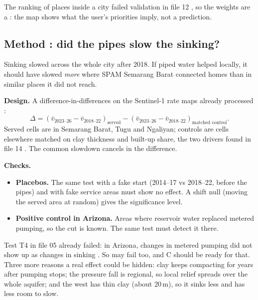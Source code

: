 The ranking of places inside a city failed validation in file 12 \cite{exp12}, so the weights are a
\Scn: the map shows what the user's priorities imply, not a prediction.

\subsection{Method : did the pipes slow the sinking?}\label{sec:did}

\begin{plain}
Sinking slowed across the whole city after 2018. If piped water helped locally, it should have slowed
\emph{more} where SPAM Semarang Barat connected homes than in similar places it did not reach.
\end{plain}

\textbf{Design.} A difference-in-differences on the Sentinel-1 rate maps already processed :
\[
\Delta = (\bar v_{2023\text{--}26} - \bar v_{2018\text{--}22})_{\text{served}} - (\bar v_{2023\text{--}26} - \bar v_{2018\text{--}22})_{\text{matched control}} .
\]
Served cells are in Semarang Barat, Tugu and Ngaliyan; controls are cells elsewhere matched on clay
thickness and built-up share, the two drivers found in file 14 \cite{exp14}. The common slowdown cancels
in the difference.

\textbf{Checks.}
\begin{itemize}
\item {} \textbf{Placebos.} The same test with a fake start (2014--17 vs 2018--22, before the pipes) and
  with fake service areas must show no effect. A shift null (moving the served area at random) gives the
  significance level.
\item {} \textbf{Positive control in Arizona.} Areas where reservoir water replaced metered pumping, so
  the cut is known. The same test must detect it there.
\end{itemize}

\begin{caution}
Test T4 in file 05 already failed: in Arizona, changes in metered pumping did not show up as changes in
sinking \cite{exp05}. So  may fail too, and C should be ready for that. Three more reasons a real
effect could be hidden: clay keeps compacting for years after pumping stops; the pressure fall is regional,
so local relief spreads over the whole aquifer; and the west has thin clay (about 20\,m), so it sinks
less and has less room to slow.
\end{caution}

